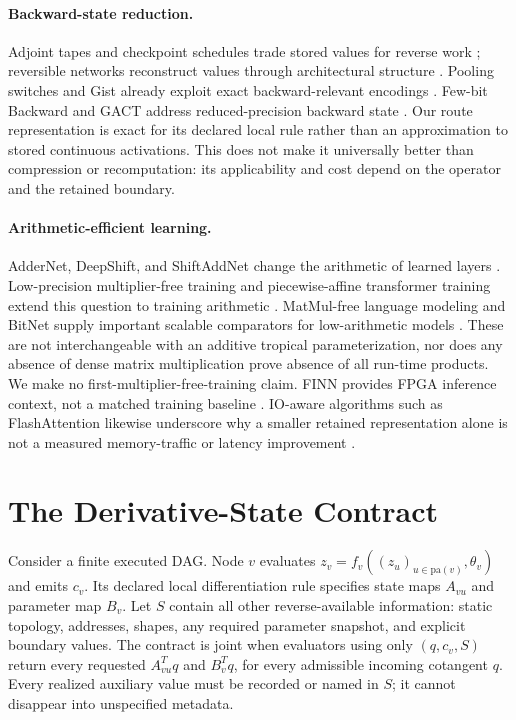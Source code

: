 \documentclass{article}
\theoremstyle{plain}
\theoremstyle{definition}
\theoremstyle{remark}
\begin{document}
\paragraph{Backward-state reduction.}
Adjoint tapes and checkpoint schedules trade stored values for reverse work
\citep{giering1998recipes,griewank2000revolve,chen2016sublinear,jain2020checkmate};
reversible networks reconstruct values through architectural structure
\citep{gomez2017reversible}. Pooling switches and Gist already exploit exact
backward-relevant encodings \citep{zeiler2014visualizing,jain2018gist}.
Few-bit Backward and GACT address reduced-precision backward state
\citep{novikov2023fewbit,liu2022gact}.
Our route representation is exact for its declared local rule rather than
an approximation to stored continuous activations. This does not make it
universally better than compression or recomputation: its applicability and
cost depend on the operator and the retained boundary.

\paragraph{Arithmetic-efficient learning.}
AdderNet, DeepShift, and ShiftAddNet change the arithmetic of learned layers
\citep{addernet,deepShift,shiftaddnet}. Low-precision multiplier-free
training and piecewise-affine transformer training extend this question to
training arithmetic \citep{liu2023multfree,kosson2023multiplicationfree}.
MatMul-free language modeling and BitNet supply important scalable
comparators for low-arithmetic models \citep{zhu2024matmulfree,ma2024bitnet,ma2025bitnet}.
These are not interchangeable with an additive tropical parameterization,
nor does any absence of dense matrix multiplication prove absence of all
run-time products. We make no first-multiplier-free-training claim.
FINN provides FPGA inference context, not a matched training baseline
\citep{umuroglu2017finn}. IO-aware algorithms such as FlashAttention likewise
underscore why a smaller retained representation alone is not a measured
memory-traffic or latency improvement \citep{dao2022flashattention}.

\section{The Derivative-State Contract}
\label{sec:contract}

Consider a finite executed DAG. Node $v$ evaluates
$z_v=f_v((z_u)_{u\in\mathrm{pa}(v)},\theta_v)$ and emits $c_v$.
Its declared local differentiation rule specifies state maps $A_{vu}$ and
parameter map $B_v$. Let $S$ contain all other reverse-available information:
static topology, addresses, shapes, any required parameter snapshot, and
explicit boundary values. The contract is joint when evaluators using only
$(q,c_v,S)$ return every requested $A_{vu}^Tq$ and $B_v^Tq$, for every
admissible incoming cotangent $q$. Every realized auxiliary value must be
recorded or named in $S$; it cannot disappear into unspecified metadata.
\end{document}
